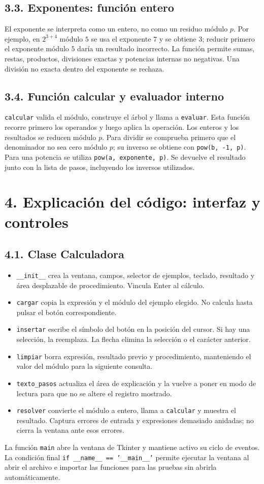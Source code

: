 \documentclass[11pt,a4paper]{article}
\begin{document}
\subsection*{3.3. Exponentes: función entero}
El exponente se interpreta como un entero, no como un residuo módulo $p$.
Por ejemplo, en $2^{3+4}$ módulo $5$ se usa el exponente $7$ y se obtiene $3$;
reducir primero el exponente módulo $5$ daría un resultado incorrecto.
La función permite sumas, restas, productos, divisiones exactas y potencias
internas no negativas. Una división no exacta dentro del exponente se rechaza.

\subsection*{3.4. Función calcular y evaluador interno}
\texttt{calcular} valida el módulo, construye el árbol y llama a
\texttt{evaluar}. Esta función recorre primero los operandos y luego aplica
la operación. Los enteros y los resultados se reducen módulo $p$.
Para dividir se comprueba primero que el denominador no sea cero módulo $p$;
su inverso se obtiene con \texttt{pow(b, -1, p)}. Para una potencia se utiliza
\texttt{pow(a, exponente, p)}. Se devuelve el resultado junto con la lista de
pasos, incluyendo los inversos utilizados.

\newpage
\section*{4. Explicación del código: interfaz y controles}
\subsection*{4.1. Clase Calculadora}
\begin{itemize}
\item \texttt{\_\_init\_\_} crea la ventana, campos, selector de ejemplos,
teclado, resultado y área desplazable de procedimiento. Vincula Enter al cálculo.
\item \texttt{cargar} copia la expresión y el módulo del ejemplo elegido.
No calcula hasta pulsar el botón correspondiente.
\item \texttt{insertar} escribe el símbolo del botón en la posición del
cursor. Si hay una selección, la reemplaza. La flecha elimina la selección
o el carácter anterior.
\item \texttt{limpiar} borra expresión, resultado previo y procedimiento,
manteniendo el valor del módulo para la siguiente consulta.
\item \texttt{texto\_pasos} actualiza el área de explicación y la vuelve a
poner en modo de lectura para que no se altere el registro mostrado.
\item \texttt{resolver} convierte el módulo a entero, llama a
\texttt{calcular} y muestra el resultado. Captura errores de entrada y
expresiones demasiado anidadas; no cierra la ventana ante esos errores.
\end{itemize}
La función \texttt{main} abre la ventana de Tkinter y mantiene activo su ciclo
de eventos. La condición final \texttt{if \_\_name\_\_ == '\_\_main\_\_'}
permite ejecutar la ventana al abrir el archivo e importar las funciones para
las pruebas sin abrirla automáticamente.
\end{document}
